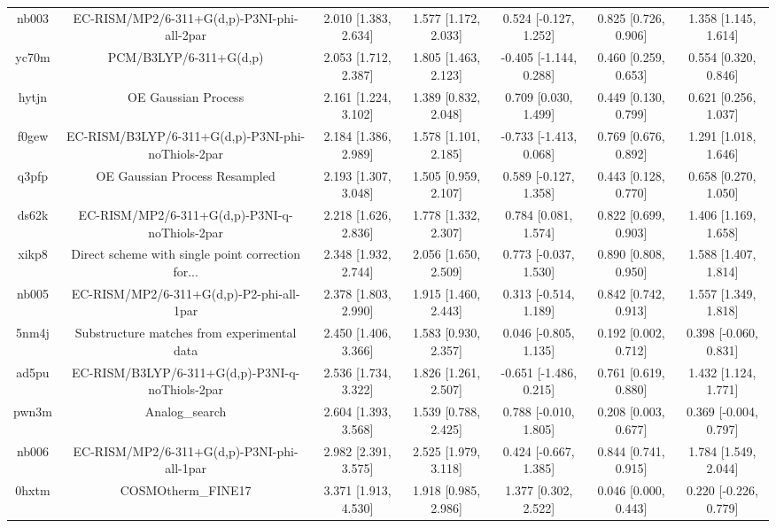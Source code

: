 \documentclass{article}
\begin{document}
\begin{center}
\begin{longtable}{|ccccccc|}
 nb003 &         EC-RISM/MP2/6-311+G(d,p)-P3NI-phi-all-2par &  2.010 [1.383, 2.634] &  1.577 [1.172, 2.033] &    0.524 [-0.127, 1.252] &  0.825 [0.726, 0.906] &   1.358 [1.145, 1.614] \\
 yc70m &                             PCM/B3LYP/6-311+G(d,p) &  2.053 [1.712, 2.387] &  1.805 [1.463, 2.123] &   -0.405 [-1.144, 0.288] &  0.460 [0.259, 0.653] &   0.554 [0.320, 0.846] \\
 hytjn &                                OE Gaussian Process &  2.161 [1.224, 3.102] &  1.389 [0.832, 2.048] &     0.709 [0.030, 1.499] &  0.449 [0.130, 0.799] &   0.621 [0.256, 1.037] \\
 f0gew &  EC-RISM/B3LYP/6-311+G(d,p)-P3NI-phi-noThiols-2par &  2.184 [1.386, 2.989] &  1.578 [1.101, 2.185] &   -0.733 [-1.413, 0.068] &  0.769 [0.676, 0.892] &   1.291 [1.018, 1.646] \\
 q3pfp &                      OE Gaussian Process Resampled &  2.193 [1.307, 3.048] &  1.505 [0.959, 2.107] &    0.589 [-0.127, 1.358] &  0.443 [0.128, 0.770] &   0.658 [0.270, 1.050] \\
 ds62k &      EC-RISM/MP2/6-311+G(d,p)-P3NI-q-noThiols-2par &  2.218 [1.626, 2.836] &  1.778 [1.332, 2.307] &     0.784 [0.081, 1.574] &  0.822 [0.699, 0.903] &   1.406 [1.169, 1.658] \\
 xikp8 &  Direct scheme with single point correction for... &  2.348 [1.932, 2.744] &  2.056 [1.650, 2.509] &    0.773 [-0.037, 1.530] &  0.890 [0.808, 0.950] &   1.588 [1.407, 1.814] \\
 nb005 &           EC-RISM/MP2/6-311+G(d,p)-P2-phi-all-1par &  2.378 [1.803, 2.990] &  1.915 [1.460, 2.443] &    0.313 [-0.514, 1.189] &  0.842 [0.742, 0.913] &   1.557 [1.349, 1.818] \\
 5nm4j &        Substructure matches from experimental data &  2.450 [1.406, 3.366] &  1.583 [0.930, 2.357] &    0.046 [-0.805, 1.135] &  0.192 [0.002, 0.712] &  0.398 [-0.060, 0.831] \\
 ad5pu &    EC-RISM/B3LYP/6-311+G(d,p)-P3NI-q-noThiols-2par &  2.536 [1.734, 3.322] &  1.826 [1.261, 2.507] &   -0.651 [-1.486, 0.215] &  0.761 [0.619, 0.880] &   1.432 [1.124, 1.771] \\
 pwn3m &                                     Analog\_search &  2.604 [1.393, 3.568] &  1.539 [0.788, 2.425] &    0.788 [-0.010, 1.805] &  0.208 [0.003, 0.677] &  0.369 [-0.004, 0.797] \\
 nb006 &         EC-RISM/MP2/6-311+G(d,p)-P3NI-phi-all-1par &  2.982 [2.391, 3.575] &  2.525 [1.979, 3.118] &    0.424 [-0.667, 1.385] &  0.844 [0.741, 0.915] &   1.784 [1.549, 2.044] \\
 0hxtm &                                 COSMOtherm\_FINE17 &  3.371 [1.913, 4.530] &  1.918 [0.985, 2.986] &     1.377 [0.302, 2.522] &  0.046 [0.000, 0.443] &  0.220 [-0.226, 0.779] \\
\end{longtable}
\end{center}
\end{document}
